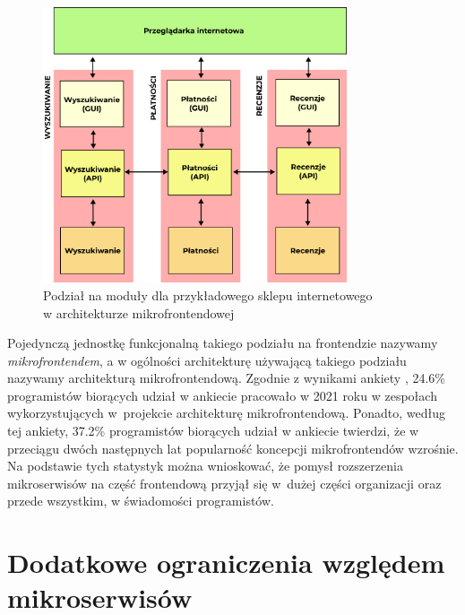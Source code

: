 \documentclass{SGGW-thesis}
\begin{document}
\begin{figure}[h]
	\centering
	\captionsetup{justification=centering}
	\includegraphics[width=0.8\textwidth]{microfrontends_diagram.png}
	\caption{Podział na moduły dla przykładowego sklepu internetowego \\ w architekturze mikrofrontendowej}
	\label{fig:microfrontends_diagram}
\end{figure}

Pojedynczą jednostkę funkcjonalną takiego podziału na frontendzie nazywamy \textit{mikrofrontendem}, a w ogólności architekturę używającą takiego podziału nazywamy architekturą mikrofrontendową.
Zgodnie z wynikami ankiety \cite{tsh_2022}, 24.6\% programistów biorących udział w ankiecie pracowało w 2021 roku w zespołach wykorzystujących w~projekcie architekturę mikrofrontendową. Ponadto, według tej ankiety, 37.2\% programistów biorących udział w ankiecie twierdzi, że w przeciągu dwóch następnych lat popularność koncepcji mikrofrontendów wzrośnie. Na podstawie tych statystyk można wnioskować, że pomysł rozszerzenia mikroserwisów na część frontendową przyjął się w~dużej części organizacji oraz przede wszystkim, w świadomości programistów.

\section{Dodatkowe ograniczenia względem mikroserwisów}
\end{document}
